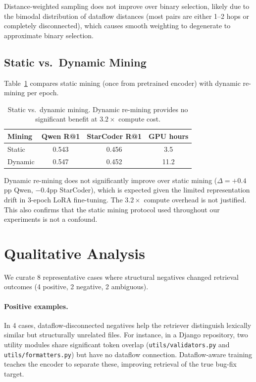 \documentclass[11pt,a4paper]{article}
\begin{document}
Distance-weighted sampling does not improve over binary selection, likely due to the bimodal distribution of dataflow distances (most pairs are either 1--2 hops or completely disconnected), which causes smooth weighting to degenerate to approximate binary selection.

\subsection{Static vs.\ Dynamic Mining}
\label{sec:dynamic}

Table~\ref{tab:dynamic} compares static mining (once from pretrained encoder) with dynamic re-mining per epoch.

\begin{table}[t]
\centering
\small
\begin{tabular}{lccc}
\toprule
\textbf{Mining} & \textbf{Qwen R@1} & \textbf{StarCoder R@1} & \textbf{GPU hours} \\
\midrule
Static & 0.543 & 0.456 & 3.5 \\
Dynamic & 0.547 & 0.452 & 11.2 \\
\bottomrule
\end{tabular}
\caption{Static vs.\ dynamic mining. Dynamic re-mining provides no significant benefit at $3.2\times$ compute cost.}
\label{tab:dynamic}
\end{table}

Dynamic re-mining does not significantly improve over static mining ($\Delta = +0.4$pp Qwen, $-$0.4pp StarCoder), which is expected given the limited representation drift in 3-epoch LoRA fine-tuning. The $3.2\times$ compute overhead is not justified. This also confirms that the static mining protocol used throughout our experiments is not a confound.

\section{Qualitative Analysis}
\label{sec:qualitative}

We curate 8 representative cases where structural negatives changed retrieval outcomes (4 positive, 2 negative, 2 ambiguous).

\paragraph{Positive examples.} In 4 cases, dataflow-disconnected negatives help the retriever distinguish lexically similar but structurally unrelated files. For instance, in a Django repository, two utility modules share significant token overlap (\texttt{utils/validators.py} and \texttt{utils/formatters.py}) but have no dataflow connection. Dataflow-aware training teaches the encoder to separate these, improving retrieval of the true bug-fix target.
\end{document}
